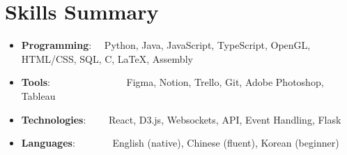 \documentclass[letter,11pt]{extarticle}
\newcommand{\resumeSkillItem}[2]{
	\item\small{
		\textbf{#1}{: #2 \vspace{-2pt}}
	}
}
\newcommand{\resumeSubItem}[2]{\resumeSkillItem{#1}{#2}\vspace{-5pt}}
\newcommand{\resumeSubHeadingListStart}{\begin{itemize}[leftmargin=0.15in,label={}]}
\newcommand{\resumeSubHeadingListEnd}{\end{itemize}}
\begin{document}
\section{Skills Summary}
	\resumeSubHeadingListStart
		\resumeSubItem{Programming}
			{\hspace{0.6mm}~~Python, Java, JavaScript, TypeScript, OpenGL, HTML/CSS, SQL, C, \LaTeX, Assembly}
		\resumeSubItem{Tools}
            {\hspace{0.3mm}~~~~~~~~~~~~~~~Figma, Notion, Trello, Git, Adobe
                Photoshop, Tableau}
		\resumeSubItem{Technologies}
			{~~~~React, D3.js, Websockets, API, Event Handling, Flask}
        \resumeSubItem{Languages}
			{\hspace{0.6mm}~~~~~~~English (native), Chinese (fluent), Korean (beginner)}
	\resumeSubHeadingListEnd
\end{document}

